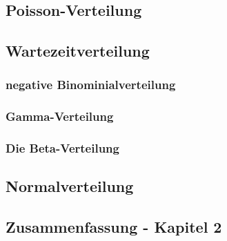 \documentclass[a4paper,12pt]{article}%
\begin{document}
	
	\subsection{Poisson-Verteilung}
	\subsection{Wartezeitverteilung}
	\subsubsection{negative Binominialverteilung}
	\subsubsection{Gamma-Verteilung}
	\subsubsection{Die Beta-Verteilung}
	\subsection{Normalverteilung}
	\newpage
	
	
	
	\subsection{Zusammenfassung - Kapitel 2}
	
	
	
\end{document}
